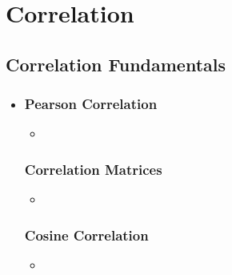 \chapter{Correlation}

\section{Correlation Fundamentals}
\begin{itemize}
  \item []
  
  \subsection{Pearson Correlation}
  \begin{itemize}
    \item 
  \end{itemize}

  \subsection{Correlation Matrices}
  \begin{itemize}
    \item 
  \end{itemize}

  \subsection{Cosine Correlation}
  \begin{itemize}
    \item 
  \end{itemize}
  
\end{itemize}


